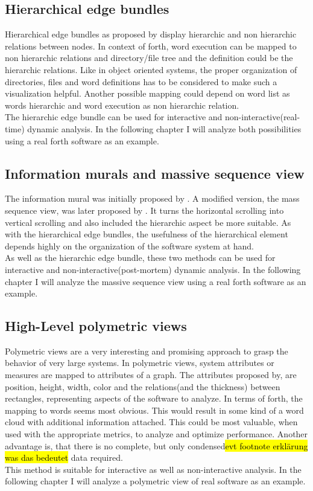 \subsection*{Hierarchical edge bundles}
Hierarchical edge bundles as proposed by \cite{Holten:2006:HEB:1187627.1187772} display hierarchic and non hierarchic relations between nodes. In context of forth, word execution can be mapped to non hierarchic relations and directory/file tree and the definition could be the hierarchic relations. Like in object oriented systems, the proper organization of directories, files and word definitions has to be considered to make such a visualization helpful.
Another possible mapping could depend on word list as words hierarchic and word execution as non hierarchic relation.
\\
The hierarchic edge bundle can be used for interactive and non-interactive(real-time) dynamic analysis. In the following chapter I will analyze both possibilities using a real forth software as an example.

\subsection*{Information murals and massive sequence view}
The information mural was initially proposed by \cite{Jerding:1998:IMT:614271.614408}. A modified version, the mass sequence view, was later proposed by \cite{Cornelissen2009}. It turns the horizontal scrolling into vertical scrolling and also included the hierarchic aspect be more suitable. As with the hierarchical edge bundles, the usefulness of the hierarchical element depends highly on the organization of the software system at hand.
\\
As well as the hierarchic edge bundle, these two methods can be used for interactive and non-interactive(post-mortem) dynamic analysis. In the following chapter I will analyze the massive sequence view using a real forth software as an example.

\subsection*{High-Level polymetric views}
Polymetric views\cite{Ducasse:2004:HPV:977397.977739} are a very interesting and promising approach to grasp the behavior of very large systems. In polymetric views, system attributes or measures are mapped to attributes of a graph. The attributes proposed by\cite{Ducasse:2004:HPV:977397.977739}, are position, height, width, color and the relations(and the thickness) between rectangles, representing aspects of the software to analyze. In terms of forth, the mapping to words seems most obvious. This would result in some kind of a word cloud with additional information attached. This could be most valuable, when used with the appropriate metrics, to analyze and optimize performance. Another advantage is, that there is no complete, but only condensed\hl{evt footnote erklärung was das bedeutet} data required.
\\
This method is suitable for interactive as well as non-interactive analysis. In the following chapter I will analyze a polymetric view of real software as an example.

